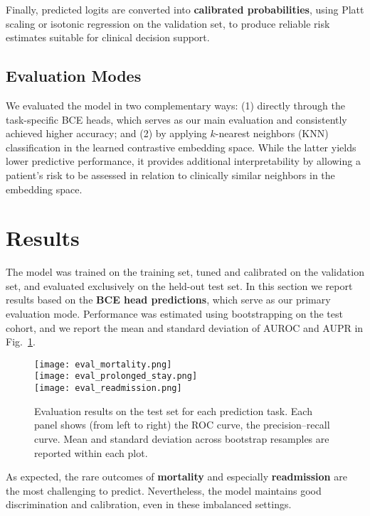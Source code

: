 \documentclass{article}
\theoremstyle{plain}
\theoremstyle{definition}
\theoremstyle{remark}
\begin{document}
Finally, predicted logits are converted into \textbf{calibrated probabilities}, using Platt scaling or isotonic regression on the validation set, to produce reliable risk estimates suitable for clinical decision support.
\subsection{Evaluation Modes}

We evaluated the model in two complementary ways:  
(1) directly through the task-specific BCE heads, which serves as our main evaluation and consistently achieved higher accuracy; and  
(2) by applying $k$-nearest neighbors (KNN) classification in the learned contrastive embedding space. While the latter yields lower predictive performance, it provides additional interpretability by allowing a patient’s risk to be assessed in relation to clinically similar neighbors in the embedding space.

\section{Results}

The model was trained on the training set, tuned and calibrated on the validation set, and 
evaluated exclusively on the held-out test set. In this section we report results based on the 
\textbf{BCE head predictions}, which serve as our primary evaluation mode. 
Performance was estimated using bootstrapping on the test cohort, and we report the mean and standard deviation 
of AUROC and AUPR in Fig.~\ref{fig:evaluation}. 

\begin{figure}[h]
    \centering
    {\texttt{[image: eval\_mortality.png]}}\\[0.2cm]
    {\texttt{[image: eval\_prolonged\_stay.png]}}\\[0.2cm]
    {\texttt{[image: eval\_readmission.png]}}
    \caption{Evaluation results on the test set for each prediction task. Each panel shows (from left to right) 
    the ROC curve, the precision–recall curve. Mean and standard deviation across 
    bootstrap resamples are reported within each plot.}
    \label{fig:evaluation}
\end{figure}

As expected, the rare outcomes of \textbf{mortality} and especially \textbf{readmission} are the most challenging to predict. Nevertheless, the model maintains good discrimination and calibration, even in these imbalanced settings.  
\end{document}
